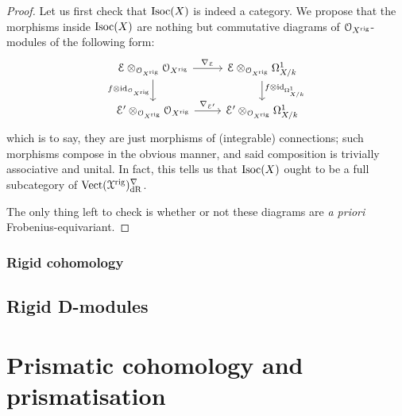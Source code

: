                 \begin{proof}
                    Let us first check that $\mathrm{Isoc}(X)$ is indeed a category. We propose that the morphisms inside $\mathrm{Isoc}(X)$ are nothing but commutative diagrams of $\mathcal{O}_{X^{\mathrm{rig}}}$-modules of the following form:
                        $$
                            \begin{tikzcd}
                            	{\E \tensor_{\calO_{X^{\rig}}} \calO_{X^{\rig}}} & {\E \tensor_{\calO_{X^{\rig}}} \Omega^1_{X/k}} \\
                            	{\E' \tensor_{\calO_{X^{\rig}}} \calO_{X^{\rig}}} & {\E' \tensor_{\calO_{X^{\rig}}} \Omega^1_{X/k}}
                            	\arrow["{f \tensor \id_{\Omega^1_{X/k}}}", from=1-2, to=2-2]
                            	\arrow["{f \tensor \id_{\calO_{X^{\rig}}}}"', from=1-1, to=2-1]
                            	\arrow["{\nabla_{\E'}}", from=2-1, to=2-2]
                            	\arrow["{\nabla_{\E}}", from=1-1, to=1-2]
                            \end{tikzcd}
                        $$
                    which is to say, they are just morphisms of (integrable) connections; such morphisms compose in the obvious manner, and said composition is trivially associative and unital. In fact, this tells us that $\mathrm{Isoc}(X)$ ought to be a full subcategory of $\mathrm{Vect}(\mathcal{X}^{\mathrm{rig}})^{\nabla}_{\mathrm{dR}}$. 
                    
                    The only thing left to check is whether or not these diagrams are \textit{a priori} Frobenius-equivariant. 
                \end{proof}
                
            \subsubsection{Rigid cohomology}
        
        \subsection{Rigid D-modules}
        
    \section{Prismatic cohomology and prismatisation}